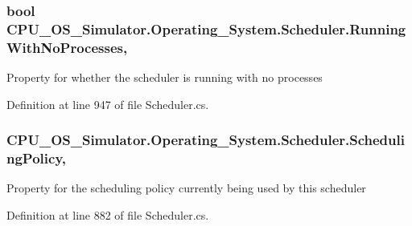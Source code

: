 \subsubsection[{Running\+With\+No\+Processes}]{\setlength{\rightskip}{0pt plus 5cm}bool C\+P\+U\+\_\+\+O\+S\+\_\+\+Simulator.\+Operating\+\_\+\+System.\+Scheduler.\+Running\+With\+No\+Processes\hspace{0.3cm}{\ttfamily [get]}, {\ttfamily [set]}}\label{class_c_p_u___o_s___simulator_1_1_operating___system_1_1_scheduler_a17ad8e2a5da8823a25da6fa4190f532d}


Property for whether the scheduler is running with no processes 



Definition at line 947 of file Scheduler.\+cs.

\hypertarget{class_c_p_u___o_s___simulator_1_1_operating___system_1_1_scheduler_afbf291846705747709c32eb79f1106b4}{}
\subsubsection[{Scheduling\+Policy}]{ C\+P\+U\+\_\+\+O\+S\+\_\+\+Simulator.\+Operating\+\_\+\+System.\+Scheduler.\+Scheduling\+Policy\hspace{0.3cm}{\ttfamily [get]}, {\ttfamily [set]}}\label{class_c_p_u___o_s___simulator_1_1_operating___system_1_1_scheduler_afbf291846705747709c32eb79f1106b4}


Property for the scheduling policy currently being used by this scheduler 



Definition at line 882 of file Scheduler.\+cs.

\hypertarget{class_c_p_u___o_s___simulator_1_1_operating___system_1_1_scheduler_aaf31b58cc7c6e632c0ce7ca34612e1ba}{}
